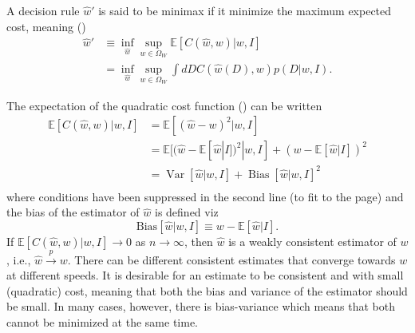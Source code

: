\begin{definition}
	\label{def:minimax}
	A decision rule $\hat{w}'$ is said to be minimax if it minimize the maximum expected cost, meaning ()
	\begin{equation}
		\begin{split}
			\hat{w}' &\equiv \inf_{\hat{w}}\sup_{w\in \Omega_W}\mathbb{E}[C(\hat{w},w)|w,I]\\
			& = \inf_{\hat{w}}\sup_{w\in \Omega_W}\int dD  C(\hat{w}(D),w) p(D|w,I).
		\end{split}
	\end{equation}
\end{definition}


\begin{theorem}
	\label{theorem:MSE}
	The expectation of the quadratic cost function () can be written
	\begin{equation}
		\begin{split}
			\mathbb{E}[C(\hat{w}, w)|w,I] &= \mathbb{E}[(\hat{w}-w)^2|w,I]\\ 
			&= \mathbb{E}[(\hat{w}-\mathbb{E}[\hat{w}|I])^2|w,I]+(w-\mathbb{E}[\hat{w}|I])^2\\
			&=\operatorname{Var}[\hat{w}|w,I]+\operatorname{Bias}[\hat{w}|w,I]^2\\
		\end{split}
		\label{eq:MSE}
	\end{equation}
	where conditions have been suppressed in the second line (to fit to the page) and the bias of the estimator of $\hat{w}$ is defined viz
	\begin{equation}
		\text{Bias}[\hat{w}|w,I]\equiv w-\mathbb{E}[\hat{w}|I].
	\end{equation}
	If $\mathbb{E}[C(\hat{w}, w)|w,I] \to 0$ as $n \to \infty$, then $\hat{w}$ is a weakly consistent estimator of $w$, i.e., $\hat{w} \xrightarrow{p} w$. There can be different consistent estimates that converge towards $w$ at different speeds. It is desirable for an estimate to be consistent and with small (quadratic) cost, meaning that both the bias and variance of the estimator should be small. In many cases, however, there is bias-variance which means that both cannot be minimized at the same time. 
\end{theorem}

